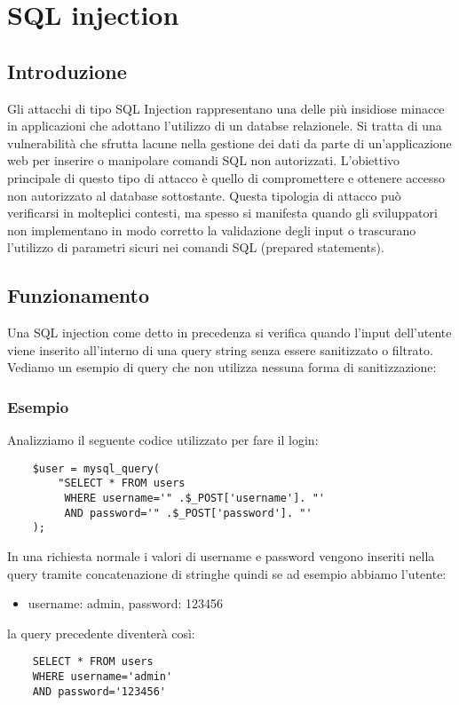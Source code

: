 \chapter{SQL injection}
\section{Introduzione}
Gli attacchi di tipo SQL Injection rappresentano una delle più insidiose minacce in applicazioni che adottano l'utilizzo di un databse relazionele. Si tratta di una vulnerabilità che sfrutta lacune nella gestione dei dati da parte di un'applicazione web per inserire o manipolare comandi SQL non autorizzati. L'obiettivo principale di questo tipo di attacco è quello di compromettere e ottenere accesso non autorizzato al database sottostante.
Questa tipologia di attacco può verificarsi in molteplici contesti, ma spesso si manifesta quando gli sviluppatori non implementano in modo corretto la validazione degli input o trascurano l'utilizzo di  parametri sicuri nei comandi SQL (prepared statements).

\section{Funzionamento}
Una SQL injection come detto in precedenza si verifica quando l'input dell'utente viene inserito all'interno di una query string senza essere sanitizzato o filtrato. Vediamo un esempio di query che non utilizza nessuna forma di sanitizzazione:

\subsection{Esempio}
Analizziamo il seguente codice utilizzato per fare il login:
\begin{lstlisting}
    $user = mysql_query(
        "SELECT * FROM users
         WHERE username='" .$_POST['username']. "'
         AND password='" .$_POST['password']. "'
    );
\end{lstlisting}
In una richiesta normale i valori di username e password vengono inseriti nella query tramite concatenazione di stringhe quindi se ad esempio abbiamo l'utente:
\begin{itemize}
    \item username: admin, password: 123456
\end{itemize}
la query precedente diventerà così:
\begin{lstlisting}
    SELECT * FROM users
    WHERE username='admin'
    AND password='123456'
\end{lstlisting}

